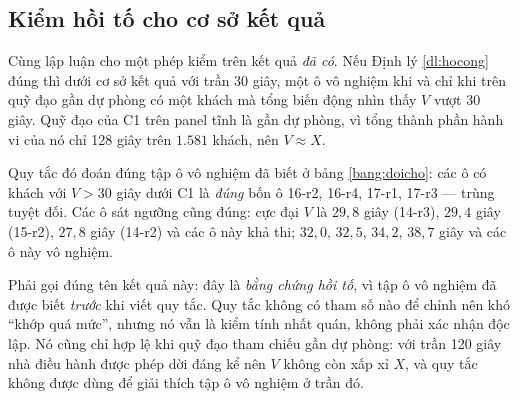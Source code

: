 \subsection{Kiểm hồi tố cho cơ sở kết quả}
\label{muc:hoito}

Cùng lập luận cho một phép kiểm trên kết quả \emph{đã có}. Nếu Định lý \ref{dl:hocong} đúng thì
dưới cơ sở kết quả với trần 30 giây, một ô vô nghiệm khi và chỉ khi trên quỹ đạo gần dự phòng có
một khách mà tổng biến động nhìn thấy $V$ vượt 30 giây. Quỹ đạo của C1 trên panel tĩnh là gần dự
phòng, vì tổng thành phần hành vi của nó chỉ 128 giây trên $1.581$ khách, nên $V \approx X$.

Quy tắc đó đoán đúng tập ô vô nghiệm đã biết ở bảng \ref{bang:doicho}: các ô có khách với $V > 30$
giây dưới C1 là \emph{đúng} bốn ô 16-r2, 16-r4, 17-r1, 17-r3 --- trùng tuyệt đối. Các ô sát ngưỡng
cũng đúng: cực đại $V$ là $29{,}8$ giây (14-r3), $29{,}4$ giây (15-r2), $27{,}8$ giây (14-r2) và các
ô này khả thi; $32{,}0$, $32{,}5$, $34{,}2$, $38{,}7$ giây và các ô này vô nghiệm.

Phải gọi đúng tên kết quả này: đây là \emph{bằng chứng hồi tố}, vì tập ô vô nghiệm đã được biết
\emph{trước} khi viết quy tắc. Quy tắc không có tham số nào để chỉnh nên khó ``khớp quá mức'', nhưng
nó vẫn là kiểm tính nhất quán, không phải xác nhận độc lập. Nó cũng chỉ hợp lệ khi quỹ đạo tham
chiếu gần dự phòng: với trần 120 giây nhà điều hành được phép dời đáng kể nên $V$ không còn xấp xỉ
$X$, và quy tắc không được dùng để giải thích tập ô vô nghiệm ở trần đó.
